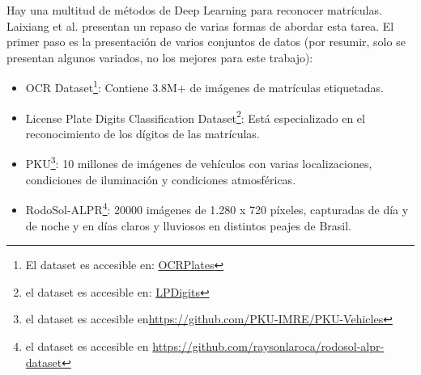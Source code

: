 \documentclass[12pt,a4paper,onecolumn,oneside]{report}
\begin{document}
Hay una multitud de métodos de Deep Learning para reconocer matrículas. Laixiang et al. \cite{XU2026108842} presentan un repaso de varias formas de abordar esta tarea. El primer paso es la presentación de varios conjuntos de datos (por resumir, solo se presentan algunos variados, no los mejores para este trabajo):
\begin{itemize}
    \item OCR Dataset\footnote{El dataset es accesible en: \href{https://www.kaggle.com/datasets/trainingdatapro/license-plates-1-209-438-ocr-plates}{OCRPlates}}: Contiene 3.8M+ de imágenes de matrículas etiquetadas.
    \item License Plate Digits Classification Dataset\footnote{el dataset es accesible en: \href{https://www.kaggle.com/datasets/aladdinss/license-plate-digits-classification-dataset}{LPDigits}}: Está especializado en el reconocimiento de los dígitos de las matrículas.
    \item PKU\footnote{el dataset es accesible en\url{https://github.com/PKU-IMRE/PKU-Vehicles}}: 10 millones de imágenes de vehículos con varias localizaciones, condiciones de iluminación y condiciones atmosféricas.
    \item RodoSol-ALPR\footnote{el dataset es accesible en \url{https://github.com/raysonlaroca/rodosol-alpr-dataset}}: 20000 imágenes de 1.280 x 720 píxeles, capturadas de día y de noche y en días claros y lluviosos en distintos peajes de Brasil.
\end{itemize}
\end{document}
